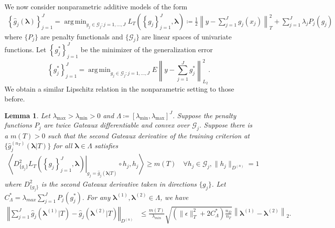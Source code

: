 \documentclass[12pt]{article} %
\newtheorem{lemma}{Lemma}
\theoremstyle{definition}
\DeclareMathOperator*{\argmin}{arg\,min}
\begin{document}
We now consider nonparametric additive models of the form
\begin{align}
\label{eq:train_crit_nonparam}
\left\{ \hat{g}_j( \boldsymbol \lambda) \right \}_{j=1}^J
=
\argmin_{g_j\in \mathcal{G}_j: j=1,...,J}  L_T\left (\left \{ g_j \right \}_{j=1}^J, \boldsymbol{\lambda} \right )
\coloneqq
\frac{1}{2} \left \| y -  \sum_{j=1}^J g_j(x_j) \right \|^2_T 
+ \sum_{j=1}^J \lambda_j P_j(g_j)
\end{align}
where $\{P_j\}$ are penalty functionals and $\{\mathcal{G}_j\}$ are linear spaces of univariate functions.
Let $\left\{ g_j^* \right \}_{j=1}^J$ be the minimizer of the generalization error
\begin{equation}
\left\{ g_j^* \right \}_{j=1}^J = \argmin_{g_j \in \mathcal{G}_j: j=1,...,J}
E \left \| y - \sum_{j=1}^J g_j^* \right \|^2_{L_2}.
\end{equation}
We obtain a similar Lipschitz relation in the nonparametric setting to those before.
\begin{lemma}
	\label{lemma:nonparam_smooth}
	Let $\lambda_{\max} > \lambda_{\min} > 0 $ and $\Lambda \coloneqq [\lambda_{\min}, \lambda_{\max}]^J$.
	Suppose the penalty functions $P_{j}$ are twice Gateaux differentiable and convex over $\mathcal{G}_j$.
	Suppose there is a $m(T) > 0$ such that the second Gateaux derivative of the training criterion at $\{\hat{g}^{(n_T)}_j( \boldsymbol{\lambda} | T)\}$ for all $\boldsymbol{\lambda} \in \Lambda$ satisfies
	\begin{align}
	\left \langle 
	\left . D^2_{\{g_j\}} L_T \left ( \left \{ g_j \right \}_{j=1}^J, \boldsymbol{\lambda} \right ) \right |_{g_j= \hat{g}_j( \boldsymbol{\lambda} | T) }
	\circ h_j, h_j
	\right \rangle 
	\ge m(T)
	\quad \forall h_j \in \mathcal{G}_j,  \|h_j \|_{D^{(n)}} = 1
	\label{eq:gateuax}
	\end{align}
	where $D^2_{\{g_j\}}$ is the second Gateaux derivative taken in directions $\{g_j\}$.
	Let $
	C_{\Lambda}^*= \lambda_{max}\sum_{j=1}^{J} P_{j}(g^*_j).
	$
	For any $\boldsymbol{\lambda}^{(1)}, \boldsymbol{\lambda}^{(2)} \in \Lambda$, we have
	\begin{align}
	\label{eq:nonparam_lipshitz_thrm}
	\left\Vert 
	\sum_{j=1}^J \hat{g}_j\left(\boldsymbol{\lambda}^{(1)} |T \right)-\hat{g}_j\left(\boldsymbol{\lambda}^{(2)} |T \right)\right\Vert _{D^{(n)}} & \le
	\frac{m(T)}{\lambda_{min}}
	\sqrt{
		\left(
		\|\epsilon\|_T^2 + 2 C^*_\Lambda
		\right)
		\frac{n_{D}}{n_{T}}
	}
	\left \|\boldsymbol{\lambda}^{(1)}-\boldsymbol{\lambda}^{(2)} \right \|_2.
	\end{align}
\end{lemma}
\end{document}
